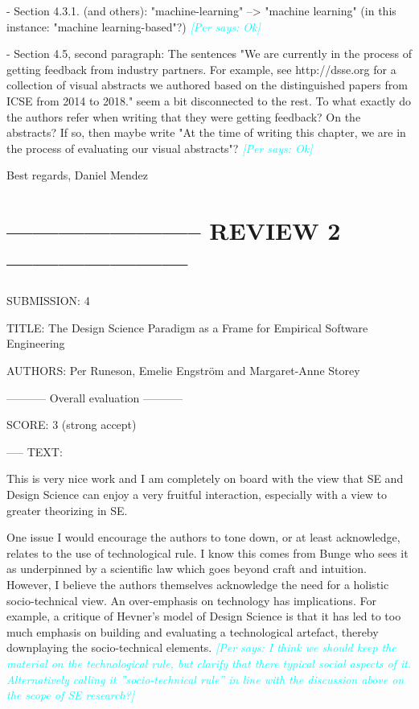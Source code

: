 \documentclass{article}
\newcommand{\per}[1]{\textcolor{cyan}{{\it [Per says: #1]}}}
\newcommand{\per}[1]{}
\begin{document}
- Section 4.3.1. (and others): "machine-learning" --> "machine learning" (in this instance: "machine learning-based"?) \per{Ok}

- Section 4.5, second paragraph: The sentences "We are currently in the process of getting feedback from industry partners. For example, see http://dsse.org for a collection of visual abstracts we authored based on the distinguished papers from ICSE from 2014 to 2018." seem a bit disconnected to the rest. To what exactly do the authors refer when writing that they were getting feedback? On the abstracts? If so, then maybe write "At the time of writing this chapter, we are in the process of evaluating our visual abstracts"? \per{Ok}

Best regards, 
Daniel Mendez



\section*{----------------------- REVIEW 2 ---------------------}
SUBMISSION: 4

TITLE: The Design Science Paradigm as a Frame for Empirical Software Engineering

AUTHORS: Per Runeson, Emelie Engström and Margaret-Anne Storey

----------- Overall evaluation -----------

SCORE: 3 (strong accept)

----- TEXT:

This is very nice work and I am completely on board with the view that SE and Design Science can enjoy a very fruitful interaction, especially with a view to greater theorizing in SE.

One issue I would encourage the authors to tone down, or at least acknowledge, relates to the use of technological rule. I know this comes from Bunge who sees it as underpinned by a scientific law which goes beyond craft and intuition. However, I believe the authors themselves acknowledge the need for a holistic socio-technical view. An over-emphasis on technology has implications. For example, a critique of Hevner’s model of Design Science is that it has led to too much emphasis on building and evaluating a technological artefact, thereby downplaying the socio-technical elements. \per{I think we should keep the material on the technological rule, but clarify that there typical social aspects of it. Alternatively calling it ''socio-technical rule'' in line with the discussion above on the scope of SE research?}
\end{document}

